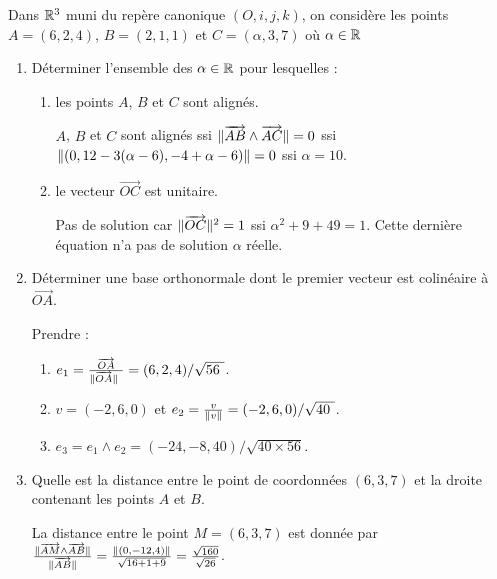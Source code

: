 \documentclass[a4paper]{article}
\begin{document}
 Dans $\mathbb{R}^3$ muni du repère canonique $(O,i,j,k)$, on considère les points $A=(6,2,4)$, $B=(2,1,1)$ et $C=(\alpha,3,7)$ où $\alpha \in \mathbb{R}$
\begin{enumerate}
\item Déterminer l'ensemble des $\alpha\in\mathbb{R}$ pour lesquelles :
	\begin{enumerate}
		\item les points $A$, $B$ et $C$ sont alignés.
			
			\bigskip
			$A$, $B$ et $C$ sont alignés ssi $\lVert\overrightarrow{AB} \wedge \overrightarrow{AC}\rVert = 0 $ ssi $ \lVert ( 0, 12 - 3 (\alpha-6), -4 + \alpha -6) \rVert = 0$ ssi $\alpha = 10$.
			\bigskip

		\item le vecteur $\overrightarrow{OC}$ est unitaire.

			\bigskip
			Pas de solution car $\lVert\overrightarrow{OC} \rVert^2 =1 $ ssi $  \alpha^2+ 9 + 49 = 1 $. Cette dernière équation n'a pas de solution $\alpha$ réelle.
			\bigskip
	\end{enumerate}
\item Déterminer une base orthonormale dont le premier vecteur est colinéaire à $\overrightarrow{OA}$.

	\bigskip
	Prendre :
	\begin{enumerate}
		\item $e_1 = \frac{\overrightarrow{OA}}{\snorm{\overrightarrow{OA} } } = (6,2,4)/ \sqrt{56 }$.
		\item $v = (-2,6,0)$ et  $e_2 = \frac{v}{\snorm{v}} = (-2,6,0)/ \sqrt{40 }$.
		 \item $e_3 = e_1 \wedge e_2 = (-24,-8,40) / \sqrt{40\times 56}$.
	\end{enumerate}
	\bigskip

\item Quelle est la distance entre le point de coordonnées $(6,3,7)$ et la droite contenant les points $A$ et $B$.
	
	\bigskip

	La distance entre le point $M = (6,3,7)$ est donnée par $ \frac{\lVert\overrightarrow{AM} \wedge \overrightarrow{AB}\rVert}{ \lVert\overrightarrow{AB} \rVert} = \frac{\lVert(0,-12,4)\rVert}{\sqrt{16+1+9}} =  \frac{\sqrt{160}}{\sqrt{26}}$.
	\bigskip

\end{enumerate}
\end{document}
